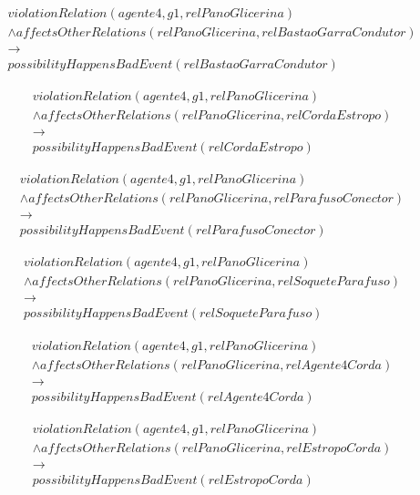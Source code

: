 \begin{eqnarray}\nonumber
	violationRelation(agente4,g1,relPanoGlicerina)  \nonumber \\ 
	\wedge affectsOtherRelations(relPanoGlicerina,relBastaoGarraCondutor)   \nonumber \\ 
	\to \nonumber \\  
	possibilityHappensBadEvent(relBastaoGarraCondutor) 
\end{eqnarray}

\begin{eqnarray}\nonumber
	violationRelation(agente4,g1,relPanoGlicerina)  \nonumber \\ 
	\wedge affectsOtherRelations(relPanoGlicerina,relCordaEstropo)   \nonumber \\ 
	\to \nonumber \\  
	possibilityHappensBadEvent(relCordaEstropo) 
\end{eqnarray}

\begin{eqnarray}\nonumber
	violationRelation(agente4,g1,relPanoGlicerina)  \nonumber \\ 
	\wedge affectsOtherRelations(relPanoGlicerina,relParafusoConector)   \nonumber \\ 
	\to \nonumber \\  
	possibilityHappensBadEvent(relParafusoConector) 
\end{eqnarray}

\begin{eqnarray}\nonumber
	violationRelation(agente4,g1,relPanoGlicerina)  \nonumber \\ 
	\wedge affectsOtherRelations(relPanoGlicerina,relSoqueteParafuso)   \nonumber \\ 
	\to \nonumber \\  
	possibilityHappensBadEvent(relSoqueteParafuso) 
\end{eqnarray}

\begin{eqnarray}\nonumber
	violationRelation(agente4,g1,relPanoGlicerina)  \nonumber \\ 
	\wedge affectsOtherRelations(relPanoGlicerina,relAgente4Corda)   \nonumber \\ 
	\to \nonumber \\  
	possibilityHappensBadEvent(relAgente4Corda) 
\end{eqnarray}

\begin{eqnarray}\nonumber
	violationRelation(agente4,g1,relPanoGlicerina)  \nonumber \\ 
	\wedge affectsOtherRelations(relPanoGlicerina,relEstropoCorda)   \nonumber \\ 
	\to \nonumber \\  
	possibilityHappensBadEvent(relEstropoCorda) 
\end{eqnarray}

